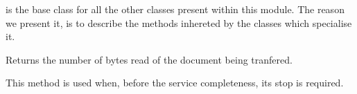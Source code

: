 \documentclass{ozdoc}
\begin{document}
 is the base class for all the other classes present within this module. The reason we present it, is to describe the methods inhereted by the classes which specialise it. \mozartEMPTY
 \mozartEMPTY
\begin{mozartDESCRIPTION}
\mozartENTRYHASCODE
\begin{mozartSYNOPSIS}
\begin{mozartCODEDISPLAY}\mozartFACETEXT{)}\end{mozartCODEDISPLAY}
\end{mozartSYNOPSIS}
\mozartITEM Returns the number  of bytes read of the document being tranfered. \mozartEMPTY
{}\mozartENTRYHASCODE
\begin{mozartSYNOPSIS}
\begin{mozartCODEDISPLAY}\mozartFACETEXT{)}\end{mozartCODEDISPLAY}
\end{mozartSYNOPSIS}
\mozartITEM This method is used when, before the service completeness, its stop is required. 


\end{mozartDESCRIPTION}
\end{document}
